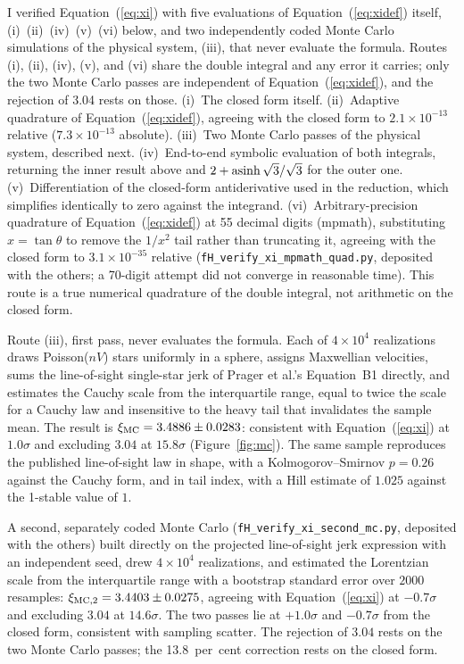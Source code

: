 \documentclass[twocolumn]{aastex701}
\begin{document}
I verified Equation~(\ref{eq:xi}) with five evaluations of Equation~(\ref{eq:xidef}) itself, (i)~(ii)~(iv)~(v)~(vi) below, and two independently coded Monte Carlo simulations of the physical system, (iii), that never evaluate the formula. Routes (i), (ii), (iv), (v), and (vi) share the double integral and any error it carries; only the two Monte Carlo passes are independent of Equation~(\ref{eq:xidef}), and the rejection of 3.04 rests on those. (i)~The closed form itself. (ii)~Adaptive quadrature of Equation~(\ref{eq:xidef}), agreeing with the closed form to $2.1\times10^{-13}$ relative ($7.3\times10^{-13}$ absolute). (iii)~Two Monte Carlo passes of the physical system, described next. (iv)~End-to-end symbolic evaluation of both integrals, returning the inner result above and $2+{\rm asinh}\,\sqrt{3}/\sqrt{3}$ for the outer one. (v)~Differentiation of the closed-form antiderivative used in the reduction, which simplifies identically to zero against the integrand. (vi)~Arbitrary-precision quadrature of Equation~(\ref{eq:xidef}) at 55 decimal digits (mpmath), substituting $x=\tan\theta$ to remove the $1/x^2$ tail rather than truncating it, agreeing with the closed form to $3.1\times10^{-35}$ relative (\texttt{fH\_verify\_xi\_mpmath\_quad.py}, deposited with the others; a 70-digit attempt did not converge in reasonable time). This route is a true numerical quadrature of the double integral, not arithmetic on the closed form.

Route (iii), first pass, never evaluates the formula. Each of $4\times10^{4}$ realizations draws Poisson($nV$) stars uniformly in a sphere, assigns Maxwellian velocities, sums the line-of-sight single-star jerk of Prager et al.'s Equation~B1 directly, and estimates the Cauchy scale from the interquartile range, equal to twice the scale for a Cauchy law and insensitive to the heavy tail that invalidates the sample mean. The result is $\xi_{\rm MC}=3.4886\pm0.0283$: consistent with Equation~(\ref{eq:xi}) at $1.0\sigma$ and excluding $3.04$ at $15.8\sigma$ (Figure~\ref{fig:mc}). The same sample reproduces the published line-of-sight law in shape, with a Kolmogorov--Smirnov $p=0.26$ against the Cauchy form, and in tail index, with a Hill estimate of $1.025$ against the 1-stable value of $1$.

A second, separately coded Monte Carlo (\texttt{fH\_verify\_xi\_second\_mc.py}, deposited with the others) built directly on the projected line-of-sight jerk expression with an independent seed, drew $4\times10^{4}$ realizations, and estimated the Lorentzian scale from the interquartile range with a bootstrap standard error over $2000$ resamples: $\xi_{\rm MC,2}=3.4403\pm0.0275$, agreeing with Equation~(\ref{eq:xi}) at $-0.7\sigma$ and excluding $3.04$ at $14.6\sigma$. The two passes lie at $+1.0\sigma$ and $-0.7\sigma$ from the closed form, consistent with sampling scatter. The rejection of $3.04$ rests on the two Monte Carlo passes; the 13.8~per~cent correction rests on the closed form.
\end{document}
